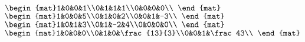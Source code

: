 \begin{Answer}
\Question $\begin{mat}1&0&0&1\\0&1&1&1\\0&0&0&0\\ \end{mat}$
\Question $\begin{mat}1&0&0&5\\0&1&0&2\\0&0&1&-3\\ \end{mat}$
\Question $\begin{mat}1&0&1&3\\0&1&-2&4\\0&0&0&0\\ \end{mat}$
\Question $\begin{mat}1&0&0&0\\0&1&0&\frac{13}{3}\\0&0&1&\frac43\\ \end{mat}$
\end{Answer}

